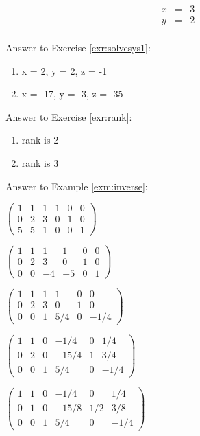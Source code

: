 \documentclass[]{book}
\theoremstyle{definition}
\theoremstyle{definition}
\theoremstyle{definition}
\theoremstyle{remark}
\begin{document}
\[\begin{matrix}
            x & = & 3\\
            y & = & 2\\         
            \end{matrix}\]

Answer to Exercise \ref{exr:solvesys1}:

\begin{enumerate}
\def\labelenumi{\arabic{enumi}.}
\item
  x = 2, y = 2, z = -1
\item
  x = -17, y = -3, z = -35
\end{enumerate}

Answer to Exercise \ref{exr:rank}:

\begin{enumerate}
\def\labelenumi{\arabic{enumi}.}
\item
  rank is 2
\item
  rank is 3
\end{enumerate}

Answer to Example \ref{exm:inverse}:

\(\left(\begin{array}{ccc|ccc}  1&1&1&1&0&0\\  0&2&3&0&1&0\\  5&5&1&0&0&1 \end{array} \right)\)

\(\left(\begin{array}{ccc|ccc}  1&1&1 &1 &0&0\\  0&2&3 &0 &1&0\\  0&0&-4&-5&0&1 \end{array} \right)\)

\(\left(\begin{array}{ccc|ccc}  1&1&1&1 &0&0\\  0&2&3&0 &1&0\\  0&0&1&5/4&0&-1/4 \end{array} \right)\)

\(\left(\begin{array}{ccc|ccc}  1&1&0&-1/4 &0&1/4\\  0&2&0&-15/4&1&3/4\\  0&0&1&5/4 &0&-1/4 \end{array} \right)\)

\(\left(\begin{array}{ccc|ccc}  1&1&0&-1/4 &0 &1/4\\  0&1&0&-15/8&1/2&3/8\\  0&0&1&5/4 &0 &-1/4 \end{array} \right)\)
\end{document}
